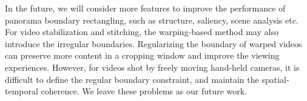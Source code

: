 \documentclass[10pt,journal,compsoc]{IEEEtran}
\begin{document}
In the future, we will consider more features to improve the performance of panorama boundary rectangling, such as structure, saliency, scene analysis etc.
For video stabilization and stitching, the warping-based method may also introduce the irregular boundaries.
Regularizing the boundary of warped videos can preserve more content in a cropping window and improve the viewing experiences.
However, for videos shot by freely moving hand-held cameras, it is difficult to define the regular boundary constraint, and maintain the spatial-temporal coherence.
We leave these problems as our future work.







\end{document}
